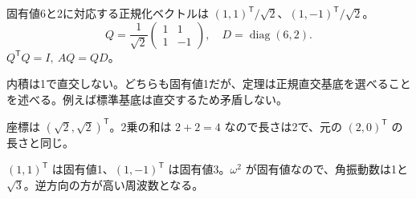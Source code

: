 \documentclass[11pt]{article}
\begin{document}

\problem[直交対角化]
\begin{ans}
固有値6と2に対応する正規化ベクトルは $(1,1)^{\mathsf T}/\sqrt2$、$(1,-1)^{\mathsf T}/\sqrt2$。\[Q=\frac1{\sqrt2}\begin{pmatrix}1&1\\1&-1\end{pmatrix},\quad D=\operatorname{diag}(6,2).\] $Q^{\mathsf T}Q=I,\ AQ=QD$。
\end{ans}

\problem[重複固有値]
\begin{ans}
内積は1で直交しない。どちらも固有値1だが、定理は正規直交基底を選べることを述べる。例えば標準基底は直交するため矛盾しない。
\end{ans}
\newpage

\problem[長さの保存]
\begin{ans}
座標は $(\sqrt2,\sqrt2)^{\mathsf T}$。2乗の和は $2+2=4$ なので長さは2で、元の $(2,0)^{\mathsf T}$ の長さと同じ。
\end{ans}

\problem[剛性のモード]
\begin{ans}
$(1,1)^{\mathsf T}$ は固有値1、$(1,-1)^{\mathsf T}$ は固有値3。$\omega^2$ が固有値なので、角振動数は1と $\sqrt3$。逆方向の方が高い周波数となる。
\end{ans}
\end{document}
